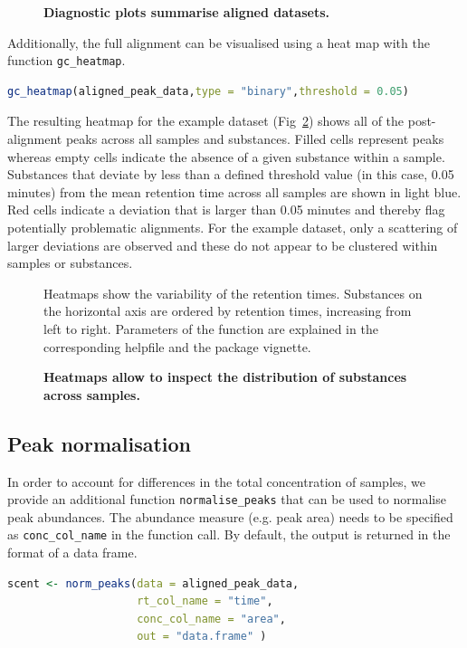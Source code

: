\documentclass[10pt,letterpaper]{article}
\begin{document}
\begin{figure}[htbp]
\centering
\caption{\textbf{Diagnostic plots summarise aligned datasets.}}
\label{Fig:Fig3}
\end{figure} 

Additionally, the full alignment can be visualised using a heat map with the function \texttt{gc\_heatmap}.

\begin{lstlisting}[language=R]
gc_heatmap(aligned_peak_data,type = "binary",threshold = 0.05)
\end{lstlisting}

The resulting heatmap for the example dataset (Fig~\ref{Fig:Fig4}) shows all of the post-alignment peaks across all samples and substances.  Filled cells represent peaks whereas empty cells indicate the absence of a given substance within a sample. Substances that deviate by less than a defined threshold value (in this case, 0.05 minutes) from the mean retention time across all samples are shown in light blue. Red cells indicate a deviation that is larger than 0.05 minutes and thereby flag potentially problematic alignments. For the example dataset, only a scattering of larger deviations are observed and these do not appear to be clustered within samples or substances.

\begin{figure}[htbp]
\centering
\caption{\textbf{Heatmaps allow to inspect the distribution of substances across samples.}}
Heatmaps show the variability of the retention times. Substances on the horizontal axis are ordered by retention times, increasing from left to right. Parameters of the function are explained in the corresponding helpfile and the package vignette.
\label{Fig:Fig4}
\end{figure} 

\subsection*{Peak normalisation}
In order to account for differences in the total concentration of samples, we provide an additional function \texttt{normalise\_peaks} that can be used to normalise peak abundances. The abundance measure (e.g. peak area) needs to be specified as \texttt{conc\_col\_name} in the function call. By default, the output is returned in the format of a data frame. 

\begin{lstlisting}[language=R]
scent <- norm_peaks(data = aligned_peak_data,
                    rt_col_name = "time",
                    conc_col_name = "area",
                    out = "data.frame" ) 
\end{lstlisting}
\end{document}
